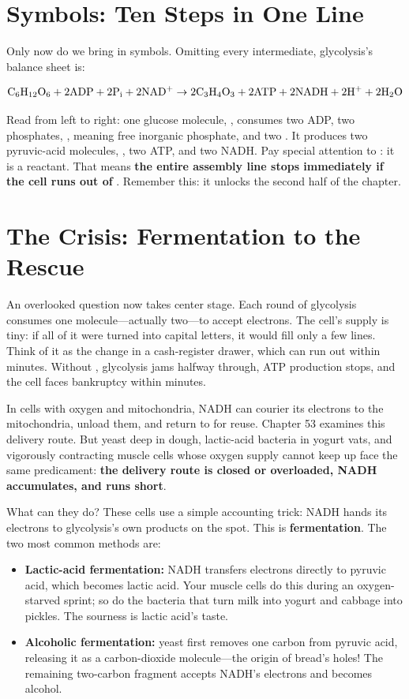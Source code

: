 \section{Symbols: Ten Steps in One Line}

Only now do we bring in symbols. Omitting every intermediate, glycolysis's balance sheet is:

\[\mathrm{C_6H_{12}O_6} + \mathrm{2ADP} + \mathrm{2P_{i}} + \mathrm{2NAD^{+}} \rightarrow \mathrm{2C_3H_4O_3} + \mathrm{2ATP} + \mathrm{2NADH} + \mathrm{2H^{+}} + \mathrm{2H_2O}\]

Read from left to right: one glucose molecule, , consumes two ADP, two phosphates, , meaning free inorganic phosphate, and two . It produces two pyruvic-acid molecules, , two ATP, and two NADH. Pay special attention to : it is a reactant. That means \textbf{the entire assembly line stops immediately if the cell runs out of }. Remember this: it unlocks the second half of the chapter.

\section{The  Crisis: Fermentation to the Rescue}

An overlooked question now takes center stage. Each round of glycolysis consumes one  molecule---actually two---to accept electrons. The cell's supply is tiny: if all of it were turned into capital letters, it would fill only a few lines. Think of it as the change in a cash-register drawer, which can run out within minutes. Without , glycolysis jams halfway through, ATP production stops, and the cell faces bankruptcy within minutes.

In cells with oxygen and mitochondria, NADH can courier its electrons to the mitochondria, unload them, and return to  for reuse. Chapter 53 examines this delivery route. But yeast deep in dough, lactic-acid bacteria in yogurt vats, and vigorously contracting muscle cells whose oxygen supply cannot keep up face the same predicament: \textbf{the delivery route is closed or overloaded, NADH accumulates, and  runs short}.

What can they do? These cells use a simple accounting trick: NADH hands its electrons to glycolysis's own products on the spot. This is \textbf{fermentation}. The two most common methods are:

\begin{itemize}[itemsep=2pt]
\item \textbf{Lactic-acid fermentation:} NADH transfers electrons directly to pyruvic acid, which becomes lactic acid. Your muscle cells do this during an oxygen-starved sprint; so do the bacteria that turn milk into yogurt and cabbage into pickles. The sourness is lactic acid's taste.
\item \textbf{Alcoholic fermentation:} yeast first removes one carbon from pyruvic acid, releasing it as a carbon-dioxide molecule---the origin of bread's holes! The remaining two-carbon fragment accepts NADH's electrons and becomes alcohol.
\end{itemize}


